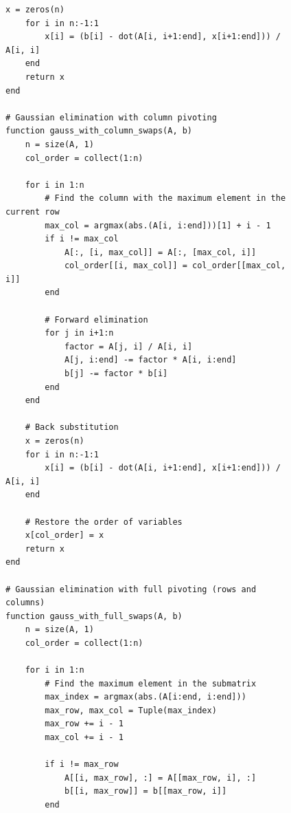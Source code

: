 \documentclass[a4paper, 14pt]{extarticle}
\begin{document}
\begin{figure}[!htb]
\begin{lstlisting}[caption={Реализация и сравнение разных вариаций метода Гаусса},label={lst:code2}]
    x = zeros(n)
    for i in n:-1:1
        x[i] = (b[i] - dot(A[i, i+1:end], x[i+1:end])) / A[i, i]
    end
    return x
end

# Gaussian elimination with column pivoting
function gauss_with_column_swaps(A, b)
    n = size(A, 1)
    col_order = collect(1:n)

    for i in 1:n
        # Find the column with the maximum element in the current row
        max_col = argmax(abs.(A[i, i:end]))[1] + i - 1
        if i != max_col
            A[:, [i, max_col]] = A[:, [max_col, i]]
            col_order[[i, max_col]] = col_order[[max_col, i]]
        end

        # Forward elimination
        for j in i+1:n
            factor = A[j, i] / A[i, i]
            A[j, i:end] -= factor * A[i, i:end]
            b[j] -= factor * b[i]
        end
    end

    # Back substitution
    x = zeros(n)
    for i in n:-1:1
        x[i] = (b[i] - dot(A[i, i+1:end], x[i+1:end])) / A[i, i]
    end

    # Restore the order of variables
    x[col_order] = x
    return x
end

# Gaussian elimination with full pivoting (rows and columns)
function gauss_with_full_swaps(A, b)
    n = size(A, 1)
    col_order = collect(1:n)

    for i in 1:n
        # Find the maximum element in the submatrix
        max_index = argmax(abs.(A[i:end, i:end]))
        max_row, max_col = Tuple(max_index)
        max_row += i - 1
        max_col += i - 1

        if i != max_row
            A[[i, max_row], :] = A[[max_row, i], :]
            b[[i, max_row]] = b[[max_row, i]]
        end
\end{lstlisting}
\end{figure}
\end{document}
